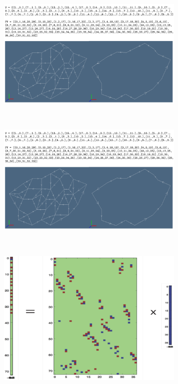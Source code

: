 \documentclass{sig-alternate}
\begin{document}
\begin{figure}[h!tb]
  \centering
  \begin{subfigure}[b]{0.31\textwidth}
  \centering
    \includegraphics[width=\textwidth]{images/minimum-a} 
    \caption{}
    \label{fig:lar-example-a}
  \end{subfigure}
  ~
  \begin{subfigure}[b]{0.32\textwidth}
  \centering
    \includegraphics[width=\textwidth]{images/minimum-b} 
    \caption{}
    \label{fig:lar-example-a}
  \end{subfigure}
  ~
  \begin{subfigure}[b]{0.33\textwidth}
    \centering
    \includegraphics[width=\textwidth]{images/boundary}
    \caption{}
    \label{fig:lar-example-b}
  \end{subfigure}
  

\end{figure}
\end{document}
